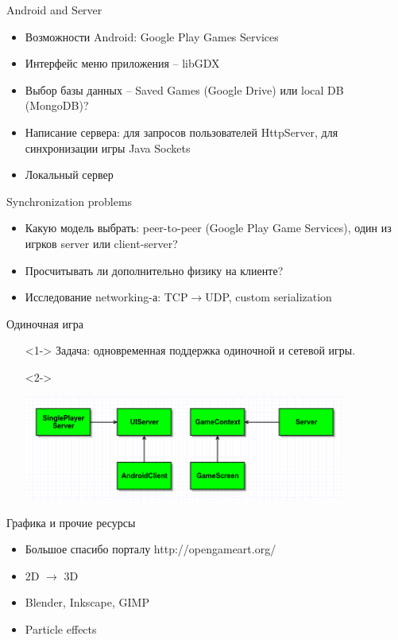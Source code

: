 \documentclass[12pt]{beamer}
\begin{document}
\begin{frame} {Android and Server}
    \begin{itemize}
        \item <1-> Возможности Android: Google Play Games Services
        \item <2-> Интерфейс меню приложения -- libGDX
        \item <3-> Выбор базы данных -- Saved Games (Google Drive) или local DB (MongoDB)?
        \item <4-> Написание сервера: для запросов пользователей HttpServer, для синхронизации игры Java Sockets
        \item <5-> Локальный сервер
    \end{itemize}
\end{frame}


\begin{frame} {Synchronization problems}
    \begin{itemize}
    	\item <1-> Какую модель выбрать: peer-to-peer (Google Play Game Services), один из игрков server или client-server?
	    \item <2-> Просчитывать ли дополнительно физику на клиенте?
	    \item <3-> Исследование networking-а: TCP$\rightarrow$UDP, custom serialization
    \end{itemize}
\end{frame}


\begin{frame} {Одиночная игра}
    \begin{itemize}
        \item[] <1-> Задача: одновременная поддержка одиночной и сетевой игры.
        \item[] <2-> \begin{center} \includegraphics[width=300pt]{singleplayer.png} \end{center}
    \end{itemize}
\end{frame}


\begin{frame}{Графика и прочие ресурсы}
    \begin{itemize}
        \item <1-> Большое спасибо порталу http://opengameart.org/
        \item <2-> 2D $\rightarrow$ 3D
        \item <3-> Blender, Inkscape, GIMP
        \item <4-> Particle effects
    \end{itemize}
\end{frame}
\end{document}
